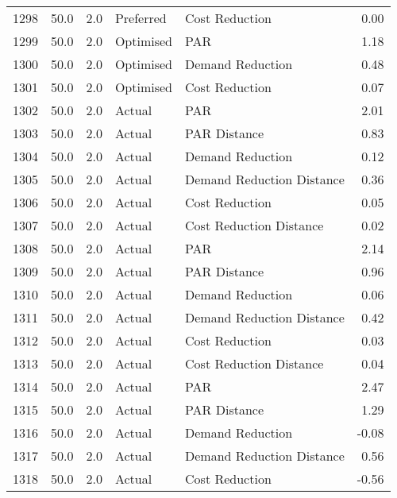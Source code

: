 \begin{longtable}{lrrllr}
1298 &         50.0 &     2.0 &      Preferred &             Cost Reduction &   0.00 \\
1299 &         50.0 &     2.0 &      Optimised &                        PAR &   1.18 \\
1300 &         50.0 &     2.0 &      Optimised &           Demand Reduction &   0.48 \\
1301 &         50.0 &     2.0 &      Optimised &             Cost Reduction &   0.07 \\
1302 &         50.0 &     2.0 &         Actual &                        PAR &   2.01 \\
1303 &         50.0 &     2.0 &         Actual &               PAR Distance &   0.83 \\
1304 &         50.0 &     2.0 &         Actual &           Demand Reduction &   0.12 \\
1305 &         50.0 &     2.0 &         Actual &  Demand Reduction Distance &   0.36 \\
1306 &         50.0 &     2.0 &         Actual &             Cost Reduction &   0.05 \\
1307 &         50.0 &     2.0 &         Actual &    Cost Reduction Distance &   0.02 \\
1308 &         50.0 &     2.0 &         Actual &                        PAR &   2.14 \\
1309 &         50.0 &     2.0 &         Actual &               PAR Distance &   0.96 \\
1310 &         50.0 &     2.0 &         Actual &           Demand Reduction &   0.06 \\
1311 &         50.0 &     2.0 &         Actual &  Demand Reduction Distance &   0.42 \\
1312 &         50.0 &     2.0 &         Actual &             Cost Reduction &   0.03 \\
1313 &         50.0 &     2.0 &         Actual &    Cost Reduction Distance &   0.04 \\
1314 &         50.0 &     2.0 &         Actual &                        PAR &   2.47 \\
1315 &         50.0 &     2.0 &         Actual &               PAR Distance &   1.29 \\
1316 &         50.0 &     2.0 &         Actual &           Demand Reduction &  -0.08 \\
1317 &         50.0 &     2.0 &         Actual &  Demand Reduction Distance &   0.56 \\
1318 &         50.0 &     2.0 &         Actual &             Cost Reduction &  -0.56 \\

\end{longtable}
